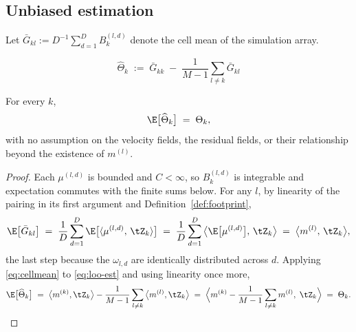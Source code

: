 \subsection{Unbiased estimation}
\label{sec:loo-estimator}

Let $\bar{G}_{kl} := D^{-1}\sum_{d=1}^{D} B_k^{(l,d)}$ denote the cell mean of the simulation
array.

\begin{definition}
\label{def:loo-est}
\begin{equation}
  \label{eq:loo-est}
  \boxed{\;\widehat{\Theta}_k \;:=\; \bar{G}_{kk} \;-\; \frac{1}{M-1}\sum_{l \neq k} \bar{G}_{kl}\;}
\end{equation}
\end{definition}

\begin{proposition}
\label{prop:unbiased}
For every $k$,
\begin{equation}
  \E\big[\widehat{\Theta}_k\big] \;=\; \Theta_k ,
\end{equation}
with no assumption on the velocity fields, the residual fields, or their relationship beyond the
existence of $m^{(l)}$.
\end{proposition}

\begin{proof}
Each $\mu^{(l,d)}$ is bounded and $C < \infty$, so $B_k^{(l,d)}$ is integrable and expectation
commutes with the finite sums below. For any $l$, by linearity of the pairing in its first
argument and Definition~\ref{def:footprint},
\begin{equation}
  \label{eq:cellmean}
  \E\big[\bar{G}_{kl}\big]
  \;=\; \frac{1}{D}\sum_{d=1}^{D} \E\big[\langle \mu^{(l,d)},\, \tZ_k\rangle\big]
  \;=\; \frac{1}{D}\sum_{d=1}^{D} \big\langle \E\big[\mu^{(l,d)}\big],\, \tZ_k\big\rangle
  \;=\; \big\langle m^{(l)},\, \tZ_k \big\rangle ,
\end{equation}
the last step because the $\omega_{l,d}$ are identically distributed across $d$. Applying
\eqref{eq:cellmean} to \eqref{eq:loo-est} and using linearity once more,
\begin{equation}
  \E\big[\widehat{\Theta}_k\big]
  \;=\; \big\langle m^{(k)}, \tZ_k\big\rangle - \frac{1}{M-1}\sum_{l\neq k}\big\langle m^{(l)}, \tZ_k\big\rangle
  \;=\; \Big\langle m^{(k)} - \frac{1}{M-1}\sum_{l\neq k} m^{(l)},\;\tZ_k\Big\rangle
  \;=\; \Theta_k . \qedhere
\end{equation}
\end{proof}

